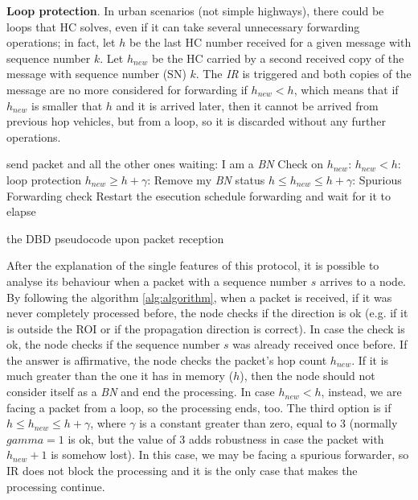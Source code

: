 \documentclass{acm_proc_article-sp}
\begin{document}
\textbf{Loop protection}. In urban scenarios (not simple highways), there could be loops that HC solves, even if it can take several unnecessary forwarding operations; in fact, let $h$ be the last HC number received for a given message with sequence number $k$. Let $h_{new}$ be the HC carried by a second received copy of the message with sequence number (SN) $k$. The \textit{IR} is triggered and both copies of the message are no more considered for forwarding if $h_{new}<h$, which means that if $h_{new}$ is smaller that $h$ and it is arrived later, then it cannot be arrived from previous hop vehicles, but from a loop, so it is discarded without any further operations.

\begin{algorithm}
\begin{algorithmic}
						\State {}
					\Else {} 
				    \EndIf
			    \Else {} 
			    \EndIf
		\Else {} 
	    \EndIf
\EndIf
\State
{}
    \State send packet and all the other ones waiting: I am a \textit{BN}
\EndFunction
{}
	\State Check on $h_{new}$:
	\State $h_{new}<h$: loop protection
	\State $h_{new} \geqslant h + \gamma$: Remove my \textit{BN} status
	\State $h \leqslant h_{new} \leqslant h + \gamma$: Spurious Forwarding check
	\State Restart the esecution
\EndFunction
{}
			\State schedule forwarding and wait for it to elapse
			 
			\Else {} 
			\EndIf
\EndFunction
\caption{the DBD pseudocode upon packet reception}
\label{alg:algorithm}
\end{algorithmic}
\end{algorithm}

After the explanation of the single features of this protocol, it is possible to analyse its behaviour when a packet with a sequence number $s$ arrives to a node. By following the algorithm \ref{alg:algorithm}, when a packet is received, if it was never completely processed before, the node checks if the direction is ok (e.g. if it is outside the ROI or if the propagation direction is correct). In case the check is ok, the node checks if the sequence number $s$ was already received once before. If the answer is affirmative, the node checks the packet's hop count $h_{new}$. If it is much greater than the one it has in memory ($h$), then the node should not consider itself as a \textit{BN} and end the processing.
In case $h_{new}<h$, instead, we are facing a packet from a loop, so the processing ends, too. The third option is if $h \leqslant h_{new} \leqslant h+\gamma$, where $\gamma$ is a constant greater than zero, equal to 3 (normally $gamma=1$ is ok, but the value of 3 adds robustness in case the packet with $h_{new}+1$ is somehow lost). In this case, we may be facing a spurious forwarder, so IR does not block the processing and it is the only case that makes the processing continue.
\end{document}
